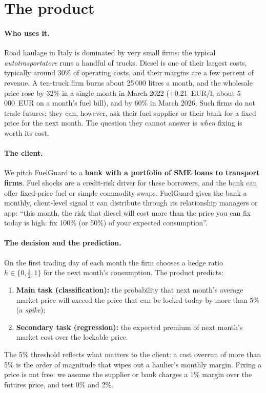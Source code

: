\section{The product}\label{sec:product}

\paragraph{Who uses it.} Road haulage in Italy is dominated by very small firms: the typical \emph{autotrasportatore}
runs a handful of trucks. Diesel is one of their largest costs, typically around 30\% of operating costs,
and their margins are a few percent of revenue. A ten-truck firm burns about 25\,000 litres a month, and
the wholesale price rose by 32\% in a single month in March 2022 (+0.21~EUR/l, about 5\,000~EUR on a
month's fuel bill), and by 60\% in March 2026. Such firms do not trade futures; they can, however, ask their fuel supplier or their bank for a
fixed price for the next month. The question they cannot answer is \emph{when} fixing is worth its cost.

\paragraph{The client.} We pitch FuelGuard to a \textbf{bank with a portfolio of SME loans to transport
firms}. Fuel shocks are a credit-risk driver for these borrowers, and the bank can offer fixed-price fuel
or simple commodity swaps. FuelGuard gives the bank a monthly, client-level signal it can distribute through
its relationship managers or app: ``this month, the risk that diesel will cost more than the price you can
fix today is high: fix 100\% (or 50\%) of your expected consumption''.

\paragraph{The decision and the prediction.} On the first trading day of each month the firm chooses a
hedge ratio $h\in\{0,\tfrac12,1\}$ for the next month's consumption. The product predicts:
\begin{enumerate}
\item \textbf{Main task (classification):} the probability that next month's average market price will
exceed the price that can be locked today by more than 5\% (a \emph{spike});
\item \textbf{Secondary task (regression):} the expected premium of next month's market cost over the
lockable price.
\end{enumerate}
The 5\% threshold reflects what matters to the client: a cost overrun of more than 5\% is the order of
magnitude that wipes out a haulier's monthly margin. Fixing a price is not free: we assume the supplier or
bank charges a 1\% margin over the futures price, and test 0\% and 2\%.

